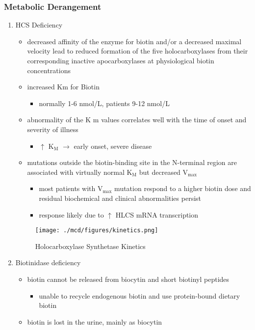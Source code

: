 \documentclass{scrartcl}
\begin{document}
\subsubsection{Metabolic Derangement}
\label{sec:org10fbe1b}
\begin{enumerate}
\item HCS Deficiency
\label{sec:org7b4cb68}
\begin{itemize}
\item decreased affinity of the enzyme for biotin and/or a decreased
maximal velocity lead to reduced formation of the five
holocarboxylases from their corresponding inactive apocarboxylases
at physiological biotin concentrations
\item increased Km for Biotin
\begin{itemize}
\item normally 1-6 nmol/L, patients 9-12 nmol/L
\end{itemize}
\item abnormality of the K m values correlates well with the time of onset
and severity of illness
\begin{itemize}
\item \(\uparrow\) K\(_{\text{M}}\) \(\to\) early onset, severe disease
\end{itemize}

\item mutations outside the biotin-binding site in the N-terminal region
are associated with virtually normal K\(_{\text{M}}\) but decreased V\(_{\text{max}}\)
\begin{itemize}
\item most patients with V\(_{\text{max}}\) mutation respond to a higher biotin
dose and residual biochemical and clinical abnormalities persist
\item response likely due to \(\uparrow\) HLCS mRNA transcription
\end{itemize}
\end{itemize}

\begin{figure}[htbp]
\centering
\texttt{[image: ./mcd/figures/kinetics.png]}
\caption[Kinetics]{\label{fig:orgdd20914}
Holocarboxylase Synthetase Kinetics}
\end{figure}

\item Biotinidase deficiency
\label{sec:org9f24e93}
\begin{itemize}
\item biotin cannot be released from biocytin and short biotinyl
peptides
\begin{itemize}
\item unable to recycle endogenous biotin and use protein-bound dietary biotin
\end{itemize}
\item biotin is lost in the urine, mainly as biocytin
\end{itemize}
\end{enumerate}
\end{document}
